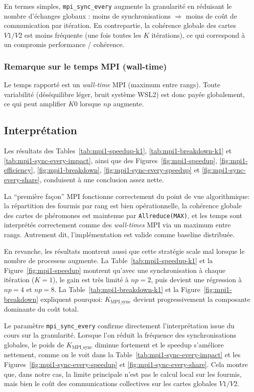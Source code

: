 En termes simples, \texttt{mpi\_sync\_every} augmente la granularité en réduisant le nombre
d'échanges globaux : moins de synchronisations \(\Rightarrow\) moins de coût de communication par itération.
En contrepartie, la cohérence globale des cartes \(V1/V2\) est moins fréquente (une fois toutes les \(K\) itérations),
ce qui correspond à un compromis performance / cohérence.

\subsubsection{Remarque sur le temps MPI (wall-time)}

Le temps rapporté est un \emph{wall-time} MPI (maximum entre rangs).
Toute variabilité (déséquilibre léger, bruit système WSL2) est donc payée globalement,
ce qui peut amplifier \(K0\) lorsque \(np\) augmente.

\subsection{Interprétation}

Les résultats des Tables~\ref{tab:mpi1-speedup-k1}, \ref{tab:mpi1-breakdown-k1} et
\ref{tab:mpi1-sync-every-impact}, ainsi que des Figures~\ref{fig:mpi1-speedup},
\ref{fig:mpi1-efficiency}, \ref{fig:mpi1-breakdown}, \ref{fig:mpi1-sync-every-speedup} et
\ref{fig:mpi1-sync-every-share}, conduisent à une conclusion assez nette.

La ``première façon'' MPI fonctionne correctement du point de vue algorithmique:
la répartition des fourmis par rang est bien opérationnelle, la cohérence globale des cartes
de phéromones est maintenue par \texttt{Allreduce(MAX)}, et les temps sont interprétés
correctement comme des \emph{wall-times} MPI via un maximum entre rangs.
Autrement dit, l'implémentation est valide comme baseline distribuée.

En revanche, les résultats montrent aussi que cette stratégie scale mal lorsque le nombre de
processus augmente. La Table~\ref{tab:mpi1-speedup-k1} et la Figure~\ref{fig:mpi1-speedup}
montrent qu'avec une synchronisation à chaque itération (\(K=1\)), le gain est très limité à
\(np=2\), puis devient une régression à \(np=4\) et \(np=8\).
La Table~\ref{tab:mpi1-breakdown-k1} et la Figure~\ref{fig:mpi1-breakdown} expliquent pourquoi:
\(K_{\text{MPI\_sync}}\) devient progressivement la composante dominante du coût total.

Le paramètre \texttt{mpi\_sync\_every} confirme directement l'interprétation issue du cours sur
la granularité. Lorsque l'on réduit la fréquence des synchronisations globales, le poids de
\(K_{\text{MPI\_sync}}\) diminue fortement et le speedup s'améliore nettement, comme on le voit
dans la Table~\ref{tab:mpi1-sync-every-impact} et les Figures~\ref{fig:mpi1-sync-every-speedup}
et \ref{fig:mpi1-sync-every-share}. Cela montre que, dans notre cas, la limite principale n'est
pas le calcul local sur les fourmis, mais bien le coût des communications collectives sur les
cartes globales \(V1/V2\).

